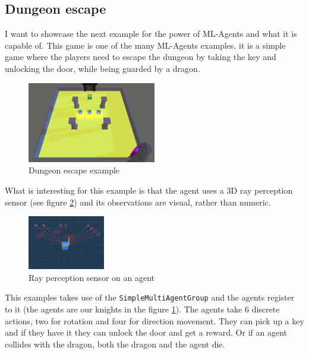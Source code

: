 \documentclass[a4paper, 12pt]{book}
\begin{document}
\subsection{Dungeon escape}

I want to showcase the next example for the power of ML-Agents and what it is capable of. This game is one of the many ML-Agents \cite{MLAgents} examples, it is a simple game where the players need to escape the dungeon by taking the key and unlocking the door, while being guarded by a dragon.

\begin{figure}[h]
\begin{center}
\includegraphics[width=0.5\textwidth]{Images/DungeonEscape.png}
\end{center}
\caption{Dungeon escape example \cite{MLAgents}}
\label{pic11}
\end{figure}

What is interesting for this example is that the agent uses a 3D ray perception sensor (see figure \ref{pic12}) and its observations are visual, rather than numeric.

\begin{figure}[h]
\begin{center}
\includegraphics[width=0.3\textwidth]{Images/AgentDungeonEscape.png}
\end{center}
\caption{Ray perception sensor on an agent}
\label{pic12}
\end{figure}

This examples takes use of the \texttt{SimpleMultiAgentGroup} and the agents register to it (the agents are our knights in the figure \ref{pic11}). The agents take 6 discrete actions, two for rotation and four for direction movement. They can pick up a key and if they have it they can unlock the door and get a reward. Or if an agent collides with the dragon, both the dragon and the agent die.
\end{document}
